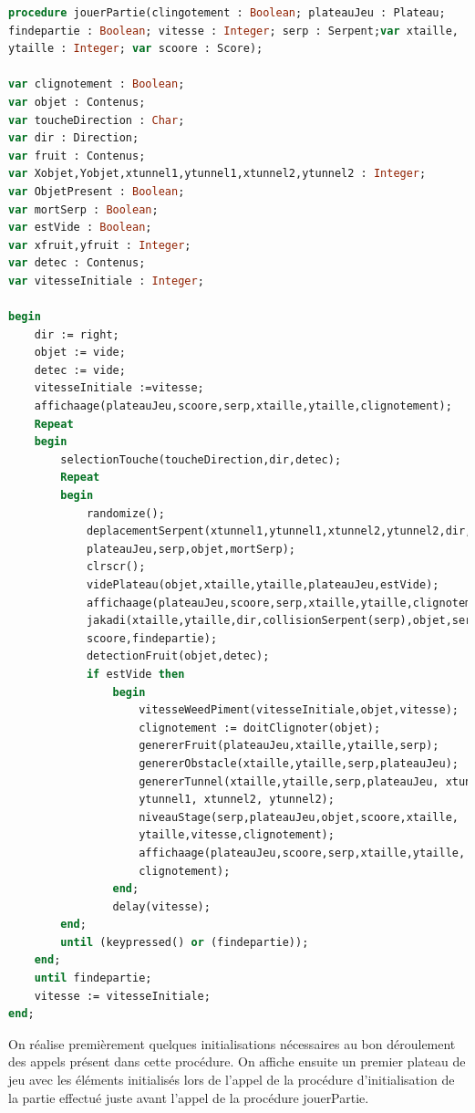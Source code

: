 \documentclass[11pt,a4paper]{article}
\begin{document}
        \small
        \begin{lstlisting}[language=Pascal,frame=single,caption=Code source de la procédure jouerPartie]        
procedure jouerPartie(clingotement : Boolean; plateauJeu : Plateau;
findepartie : Boolean; vitesse : Integer; serp : Serpent;var xtaille,
ytaille : Integer; var scoore : Score);

var clignotement : Boolean;
var objet : Contenus;
var toucheDirection : Char;
var dir : Direction;
var fruit : Contenus;
var Xobjet,Yobjet,xtunnel1,ytunnel1,xtunnel2,ytunnel2 : Integer;
var ObjetPresent : Boolean; 
var mortSerp : Boolean;
var estVide : Boolean;
var xfruit,yfruit : Integer;
var detec : Contenus;
var vitesseInitiale : Integer;

begin 
    dir := right;
    objet := vide;
    detec := vide;
    vitesseInitiale :=vitesse; 
    affichaage(plateauJeu,scoore,serp,xtaille,ytaille,clignotement); 
    Repeat 
    begin
        selectionTouche(toucheDirection,dir,detec); 
        Repeat
        begin
            randomize(); 
            deplacementSerpent(xtunnel1,ytunnel1,xtunnel2,ytunnel2,dir,
            plateauJeu,serp,objet,mortSerp);
            clrscr();
            videPlateau(objet,xtaille,ytaille,plateauJeu,estVide); 
            affichaage(plateauJeu,scoore,serp,xtaille,ytaille,clignotement);
            jakadi(xtaille,ytaille,dir,collisionSerpent(serp),objet,serp,
            scoore,findepartie);
            detectionFruit(objet,detec);
            if estVide then 
                begin
                    vitesseWeedPiment(vitesseInitiale,objet,vitesse);
                    clignotement := doitClignoter(objet);
                    genererFruit(plateauJeu,xtaille,ytaille,serp);
                    genererObstacle(xtaille,ytaille,serp,plateauJeu);
                    genererTunnel(xtaille,ytaille,serp,plateauJeu, xtunnel1,
                    ytunnel1, xtunnel2, ytunnel2);
                    niveauStage(serp,plateauJeu,objet,scoore,xtaille,
                    ytaille,vitesse,clignotement);
                    affichaage(plateauJeu,scoore,serp,xtaille,ytaille,
                    clignotement);
                end;
                delay(vitesse);	
        end;
        until (keypressed() or (findepartie));
    end;
    until findepartie;
    vitesse := vitesseInitiale; 
end;
        \end{lstlisting}
        \normalsize
        On réalise premièrement quelques initialisations nécessaires au bon déroulement des appels présent dans cette procédure. On affiche ensuite un premier plateau de jeu avec les éléments initialisés lors de l’appel de la procédure d’initialisation de la partie effectué juste avant l’appel de la procédure jouerPartie. \\\\
\end{document}
